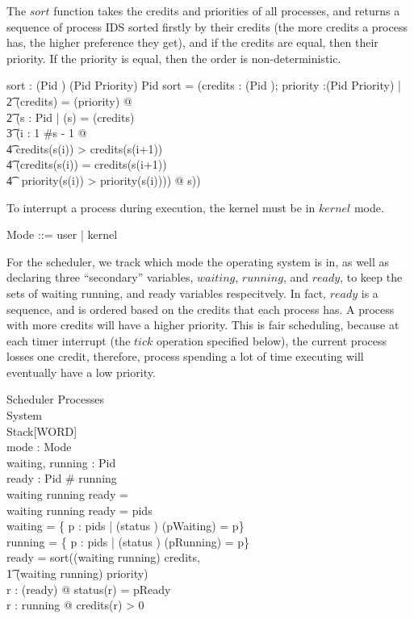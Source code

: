 \documentclass{article}
\begin{document}
The $sort$ function takes the credits and priorities of all processes,
and returns a sequence of process IDS sorted firstly by their credits
(the more credits a process has, the higher preference they get), and
if the credits are equal, then their priority. If the priority is
equal, then the order is non-deterministic.

\begin{axdef}
  sort : (Pid \pfun \nat) \cross (Pid \pfun Priority) \pfun \iseq Pid
\where
  sort =
    (\lambda credits : (Pid \pfun \nat); priority :(Pid \pfun Priority) |\\
    \t2 \dom(credits) = \dom(priority) @\\
    \t2 (\mu s : \iseq Pid | \ran(s) = \dom(credits) \land\\
      \t3 (\forall i : 1 \upto \#s - 1 @\\
        \t4 credits(s(i)) > credits(s(i+1)) \lor\\
        \t4 (credits(s(i)) = credits(s(i+1)) \land\\
        \t4 \ priority(s(i)) > priority(s(i)))) @ s))
\end{axdef}

To interrupt a process during execution, the kernel must be in $kernel$ mode.

\begin{zed}
  Mode ::= user | kernel
\end{zed}

For the scheduler, we track which mode the operating system is in, as
well as declaring three ``secondary'' variables, $waiting$, $running$,
and $ready$, to keep the sets of waiting running, and ready variables
respecitvely. In fact, $ready$ is a sequence, and is ordered based on
the credits that each process has. A process with more credits will
have a higher priority. This is fair scheduling, because at each timer
interrupt (the $tick$ operation specified below), the current process
losses one credit, therefore, process spending a lot of time executing
will eventually have a low priority.

\begin{schema}{Scheduler}
  Processes\\
  System\\
  Stack[WORD]\\
  mode : Mode\\
  waiting, running : \power Pid\\
  ready : \iseq Pid
\where
  \# running \\
  waiting \cap running \cap \ran ready = \emptyset\\
  waiting \cup running \cup \ran ready = pids\\
  waiting = \{ p : pids | (status \inv) (pWaiting) = p\}\\
  running = \{ p : pids | (status \inv) (pRunning) = p\}\\
  ready = sort((waiting \cup running) \ndres credits, \\
    \t1 (waiting \cup running) \ndres priority)\\
  \forall r : \ran(ready) @ status(r) = pReady\\
  \forall r : running @ credits(r) > 0
\end{schema}
\end{document}
